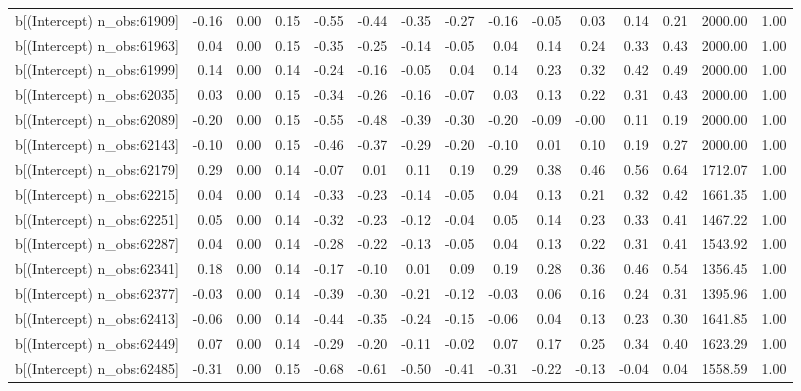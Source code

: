 \begin{table}[ht]
\begin{tabular}{rrrrrrrrrrrrrrr}
  b[(Intercept) n\_obs:61909] & -0.16 & 0.00 & 0.15 & -0.55 & -0.44 & -0.35 & -0.27 & -0.16 & -0.05 & 0.03 & 0.14 & 0.21 & 2000.00 & 1.00 \\ 
  b[(Intercept) n\_obs:61963] & 0.04 & 0.00 & 0.15 & -0.35 & -0.25 & -0.14 & -0.05 & 0.04 & 0.14 & 0.24 & 0.33 & 0.43 & 2000.00 & 1.00 \\ 
  b[(Intercept) n\_obs:61999] & 0.14 & 0.00 & 0.14 & -0.24 & -0.16 & -0.05 & 0.04 & 0.14 & 0.23 & 0.32 & 0.42 & 0.49 & 2000.00 & 1.00 \\ 
  b[(Intercept) n\_obs:62035] & 0.03 & 0.00 & 0.15 & -0.34 & -0.26 & -0.16 & -0.07 & 0.03 & 0.13 & 0.22 & 0.31 & 0.43 & 2000.00 & 1.00 \\ 
  b[(Intercept) n\_obs:62089] & -0.20 & 0.00 & 0.15 & -0.55 & -0.48 & -0.39 & -0.30 & -0.20 & -0.09 & -0.00 & 0.11 & 0.19 & 2000.00 & 1.00 \\ 
  b[(Intercept) n\_obs:62143] & -0.10 & 0.00 & 0.15 & -0.46 & -0.37 & -0.29 & -0.20 & -0.10 & 0.01 & 0.10 & 0.19 & 0.27 & 2000.00 & 1.00 \\ 
  b[(Intercept) n\_obs:62179] & 0.29 & 0.00 & 0.14 & -0.07 & 0.01 & 0.11 & 0.19 & 0.29 & 0.38 & 0.46 & 0.56 & 0.64 & 1712.07 & 1.00 \\ 
  b[(Intercept) n\_obs:62215] & 0.04 & 0.00 & 0.14 & -0.33 & -0.23 & -0.14 & -0.05 & 0.04 & 0.13 & 0.21 & 0.32 & 0.42 & 1661.35 & 1.00 \\ 
  b[(Intercept) n\_obs:62251] & 0.05 & 0.00 & 0.14 & -0.32 & -0.23 & -0.12 & -0.04 & 0.05 & 0.14 & 0.23 & 0.33 & 0.41 & 1467.22 & 1.00 \\ 
  b[(Intercept) n\_obs:62287] & 0.04 & 0.00 & 0.14 & -0.28 & -0.22 & -0.13 & -0.05 & 0.04 & 0.13 & 0.22 & 0.31 & 0.41 & 1543.92 & 1.00 \\ 
  b[(Intercept) n\_obs:62341] & 0.18 & 0.00 & 0.14 & -0.17 & -0.10 & 0.01 & 0.09 & 0.19 & 0.28 & 0.36 & 0.46 & 0.54 & 1356.45 & 1.00 \\ 
  b[(Intercept) n\_obs:62377] & -0.03 & 0.00 & 0.14 & -0.39 & -0.30 & -0.21 & -0.12 & -0.03 & 0.06 & 0.16 & 0.24 & 0.31 & 1395.96 & 1.00 \\ 
  b[(Intercept) n\_obs:62413] & -0.06 & 0.00 & 0.14 & -0.44 & -0.35 & -0.24 & -0.15 & -0.06 & 0.04 & 0.13 & 0.23 & 0.30 & 1641.85 & 1.00 \\ 
  b[(Intercept) n\_obs:62449] & 0.07 & 0.00 & 0.14 & -0.29 & -0.20 & -0.11 & -0.02 & 0.07 & 0.17 & 0.25 & 0.34 & 0.40 & 1623.29 & 1.00 \\ 
  b[(Intercept) n\_obs:62485] & -0.31 & 0.00 & 0.15 & -0.68 & -0.61 & -0.50 & -0.41 & -0.31 & -0.22 & -0.13 & -0.04 & 0.04 & 1558.59 & 1.00 \\ 

\end{tabular}
\end{table}
